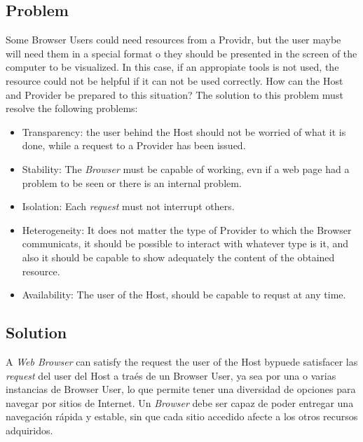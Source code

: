 \documentclass{sig-alternate-05-2015}
\begin{document}
  \subsection*{Problem}
  Some Browser Users could need resources from a Providr, but the user maybe will need them in a special format o they should be presented in the screen of the computer to be visualized. In this case, if an appropiate tools is not used, the resource could not be helpful if it can not be used correctly. How can the Host and Provider be prepared to this situation? The solution to this problem must resolve the following problems:
  \begin{itemize}
    \item Transparency: the user behind the Host should not be worried of what it is done, while a request to a Provider has been issued. 
    \item Stability: The \textit{Browser} must be capable of working, evn if a web page had a problem to be seen or there is an internal problem.
    \item Isolation: Each \textit{request} must not interrupt others.
    \item Heterogeneity: It does not matter the type of Provider to which the Browser communicats, it should be possible to interact with whatever type is it, and also it should be capable to show adequately the content of the obtained resource.
    \item Availability: The user of the Host, should be capable to requst at any time.
  \end{itemize}

  \subsection*{Solution}
  A \textit{Web Browser} can satisfy the request the user of the Host bypuede satisfacer las \textit{request} del user del Host a traés de un Browser User, ya sea por una o varias instancias de Browser User, lo que permite tener una diversidad de opciones para navegar por sitios de Internet. Un \textit{Browser} debe ser capaz de poder entregar una navegación rápida y estable, sin que cada sitio accedido afecte a los otros recursos adquiridos.
\end{document}
